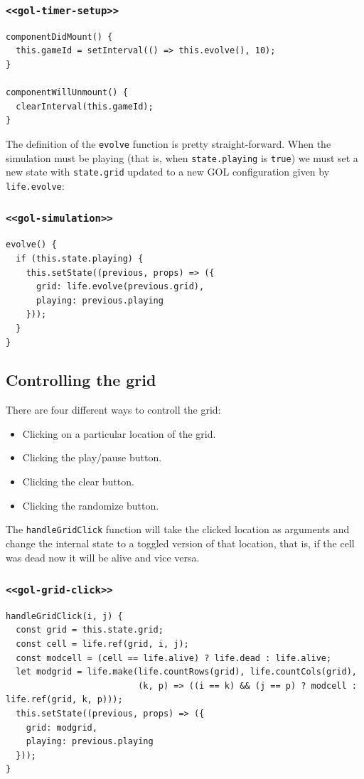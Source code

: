 \documentclass[11pt]{article}
\begin{document}
\subsubsection*{\texttt{<<gol-timer-setup>>}}
\label{sec:org7b079c8}
\begin{verbatim}
componentDidMount() {
  this.gameId = setInterval(() => this.evolve(), 10);
}

componentWillUnmount() {
  clearInterval(this.gameId);
}
\end{verbatim}

The definition of the \texttt{evolve} function is pretty straight-forward. When the simulation must be playing (that is, when \texttt{state.playing} is \texttt{true}) we must set a new state with \texttt{state.grid} updated to a new GOL configuration given by \texttt{life.evolve}:

\subsubsection*{\texttt{<<gol-simulation>>}}
\label{sec:org5d0f312}
\begin{verbatim}
evolve() {
  if (this.state.playing) {
    this.setState((previous, props) => ({
      grid: life.evolve(previous.grid),
      playing: previous.playing
    }));
  }
}
\end{verbatim}

\subsection{Controlling the grid}
\label{sec:orgd30bd19}

There are four different ways to controll the grid:
\begin{itemize}
\item Clicking on a particular location of the grid.
\item Clicking the play/pause button.
\item Clicking the clear button.
\item Clicking the randomize button.
\end{itemize}

The \texttt{handleGridClick} function will take the clicked location as arguments and change the internal state to a toggled version of that location, that is, if the cell was dead now it will be alive and vice versa.

\subsubsection*{\texttt{<<gol-grid-click>>}}
\label{sec:org89028b4}
\begin{verbatim}
handleGridClick(i, j) {
  const grid = this.state.grid;
  const cell = life.ref(grid, i, j);
  const modcell = (cell == life.alive) ? life.dead : life.alive;
  let modgrid = life.make(life.countRows(grid), life.countCols(grid),
                          (k, p) => ((i == k) && (j == p) ? modcell : life.ref(grid, k, p)));
  this.setState((previous, props) => ({
    grid: modgrid,
    playing: previous.playing
  }));
}
\end{verbatim}
\end{document}
